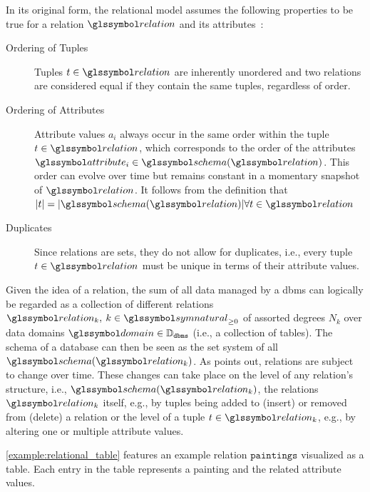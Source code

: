 In its original form, the relational model assumes the following properties to be true for a relation $\relation$ and its attributes~\cite{Codd:1970Relational}:

\begin{description}
    \item[Ordering of Tuples] Tuples $t \in \relation$ are inherently unordered and two relations are considered equal if they contain the same tuples, regardless of order.
    \item[Ordering of Attributes] Attribute values $a_{i}$ always occur in the same order within the tuple $t \in \relation$, which corresponds to the order of the attributes $\attribute_i \in \schema(\relation)$. This order can evolve over time but remains constant in a momentary snapshot of $\relation$. It follows from the definition that $|t| = |\schema(\relation)| \forall t \in \relation$
    \item[Duplicates] Since relations are sets, they do not allow for duplicates, i.e., every tuple $t \in \relation$ must be unique in terms of their attribute values.
\end{description}

Given the idea of a relation, the sum of all data managed by a \acrshort{dbms} can logically be regarded as a collection of different relations $\relation_k, \: k \in \symnatural_{\geq 0}$ of assorted degrees $N_k$ over data domains $\domain \in \mathbb{D}_{\mathtt{dbms}}$ (i.e., a collection of tables). The schema of a database can then be seen as the set system of all $\schema(\relation_k)$. As \cite{Codd:1970Relational} points out, relations are subject to change over time. These changes can take place on the level of any relation's structure, i.e., $\schema(\relation_k)$, the relations $\relation_k$ itself, e.g., by tuples being added to (insert) or removed from (delete) a relation or the level of a tuple $t \in \relation_k$, e.g., by altering one or multiple attribute values.

\cref{example:relational_table} features an example relation $\mathtt{paintings}$ visualized as a table. Each entry in the table represents a painting and the related attribute values.

